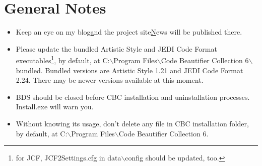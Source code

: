 \chapter{General Notes}
\begin{itemize}
  \item Keep an eye on my blog\hyperlink{http://lextm.blogspot.com} and the
  project site\hyperlink{http://gforge.oss.org.cn/projects/codebeautifiers/}
  News will be published there.
  \item Please update the bundled Artistic Style and JEDI Code Format
  executables\footnote{for JCF, JCF2Settings.cfg in data$\backslash$config
  should be updated, too.}, by default, at C:$\backslash$Program
  Files$\backslash$Code Beautifier Collection 6$\backslash$bundled. Bundled
  versions are Artistic Style 1.21 and JEDI Code Format 2.24. There
  may be newer versions available at this moment.
  \label{links}

  \item BDS should be closed before CBC installation and uninstallation
  processes. Install.exe will warn you.

  \item Without knowing its usage, don't delete any file in CBC installation
  folder, by default, at C:$\backslash$Program Files$\backslash$Code Beautifier
  Collection 6.

\end{itemize}

